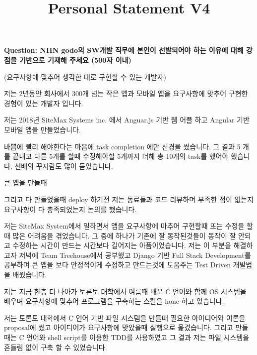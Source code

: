 \documentclass[12pt]{article}
\begin{document}
\title{Personal Statement V4}
\maketitle

\textbf{Question: NHN godo의 SW개발 직무에 본인이 선발되어야 하는 이유에 대해 강점을 기반으로 기재해 주세요 (500자 이내)}

\bigskip

(요구사항에 맞추어 생각한 대로 구현할 수 있는 개발자)

\bigskip

저는 2년동안 회사에서 300개 넘는 작은 앱과 모바일 앱을 요구사항에 맞추어 구현한 경험이 있는 개발자 입니다.

\bigskip

저는 2018년 SiteMax Systems inc. 에서 Anguar.js 기반 웹 어플 하고 Angular 기반 모바일 앱을 만들었습니다.

\bigskip

바쁨에 빨리 해야한다는 마음에 task completion 에만 신경을 썼습니다. 그 결과 5 개를 끝내고 다른 5개를 할때 수정해야할 5개까지
더해 총 10개의 task를 했어야 했습니다. 선배의 꾸지람도 많이 듣었습니다.

\bigskip

큰 앱을 만들때

\bigskip

그리고 다 만들었을때 deploy 하기전 저는 동료들과 코드 리뷰하며 부족한 점이 없는지 요구사항이 다 충족되었는지 논의를 했습니다.

\bigskip

저는 SiteMax System에서 일하면서 앱을 요구사항에 마추어 구현할때 또는 수정을 할때 많은 어려움을 겪었습니다.
그 중에 하나가 기존에 잘 동작된것들이 동작이 잘 안되고 수정하는 시간이 만드는 시간보다 길어지는 아픔이었습니다.
저는 이 부분을 해결하고자 저녁에 Team Treehouse에서 공부했고 Django 기반 Full Stack Development를
공부하며 큰 앱을 보다 안정적이게 수정하고 만드는것에 도움주는 Test Driven 개발법을 배웠습니다.

\bigskip

저는 지금 한층 더 나아가 토론토 대학에서 여름때 배운 C 언어와 함께 OS 시스템을 배우며 요구사항에 맞추어 프로그램을 구축하는 스킬을 hone 하고 있습니다.

\bigskip

저는 토론토 대학에서 C 언어 기반 파일 시스템을 만들때 필요한 아이디어와 이론을 proposal에 썼고 아이디어가 요구사항에 맞았을때 실행으로 옮겼습니다.
그리고 만들때는 C 언어와 shell script를 이용한 TDD를 사용하였고 그 결과 저는 파일 시스템을 흔들림 없이 구축 할 수 있었습니다.
\end{document}
